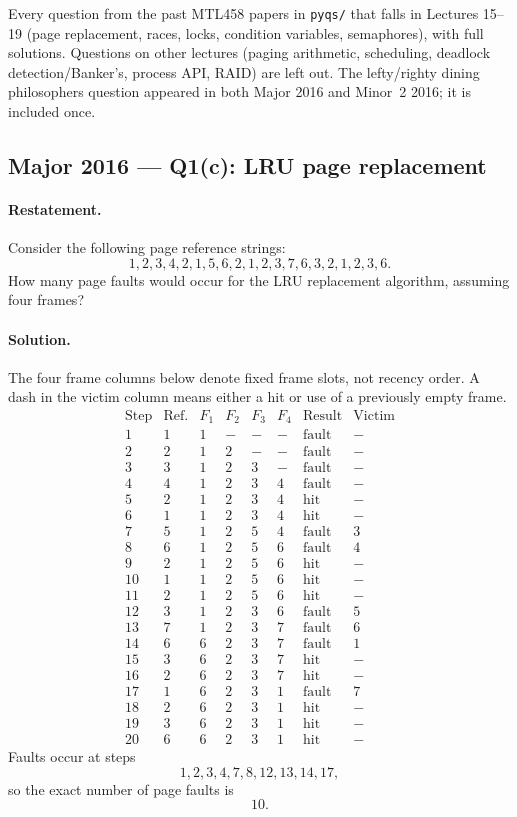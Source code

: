 \documentclass[11pt,a4paper]{article}
\begin{document}
\begin{keybox}
Every question from the past MTL458 papers in \texttt{pyqs/} that falls in
Lectures 15--19 (page replacement, races, locks, condition variables,
semaphores), with full solutions. Questions on other lectures (paging
arithmetic, scheduling, deadlock detection/Banker's, process API, RAID)
are left out. The lefty/righty dining philosophers question appeared in
both Major 2016 and Minor~2 2016; it is included once.
\end{keybox}

\subsection*{Major 2016 --- Q1(c): LRU page replacement}
\paragraph{Restatement.}
Consider the following page reference strings:
\[
1,2,3,4,2,1,5,6,2,1,2,3,7,6,3,2,1,2,3,6.
\]
How many page faults would occur for the LRU replacement algorithm,
assuming four frames?

\paragraph{Solution.}
The four frame columns below denote fixed frame slots, not recency
order.  A dash in the victim column means either a hit or use of a
previously empty frame.
\[
\begin{array}{c|c|c|c|c|c|c|c}
\mathrm{Step}&\mathrm{Ref.}&F_1&F_2&F_3&F_4&\mathrm{Result}&\mathrm{Victim}\\ \hline
1 &1&1&-&-&-&\mathrm{fault}&-\\
2 &2&1&2&-&-&\mathrm{fault}&-\\
3 &3&1&2&3&-&\mathrm{fault}&-\\
4 &4&1&2&3&4&\mathrm{fault}&-\\
5 &2&1&2&3&4&\mathrm{hit}&-\\
6 &1&1&2&3&4&\mathrm{hit}&-\\
7 &5&1&2&5&4&\mathrm{fault}&3\\
8 &6&1&2&5&6&\mathrm{fault}&4\\
9 &2&1&2&5&6&\mathrm{hit}&-\\
10&1&1&2&5&6&\mathrm{hit}&-\\
11&2&1&2&5&6&\mathrm{hit}&-\\
12&3&1&2&3&6&\mathrm{fault}&5\\
13&7&1&2&3&7&\mathrm{fault}&6\\
14&6&6&2&3&7&\mathrm{fault}&1\\
15&3&6&2&3&7&\mathrm{hit}&-\\
16&2&6&2&3&7&\mathrm{hit}&-\\
17&1&6&2&3&1&\mathrm{fault}&7\\
18&2&6&2&3&1&\mathrm{hit}&-\\
19&3&6&2&3&1&\mathrm{hit}&-\\
20&6&6&2&3&1&\mathrm{hit}&-
\end{array}
\]
Faults occur at steps
\[
1,2,3,4,7,8,12,13,14,17,
\]
so the exact number of page faults is
\[
\boxed{10}.
\]
\end{document}
